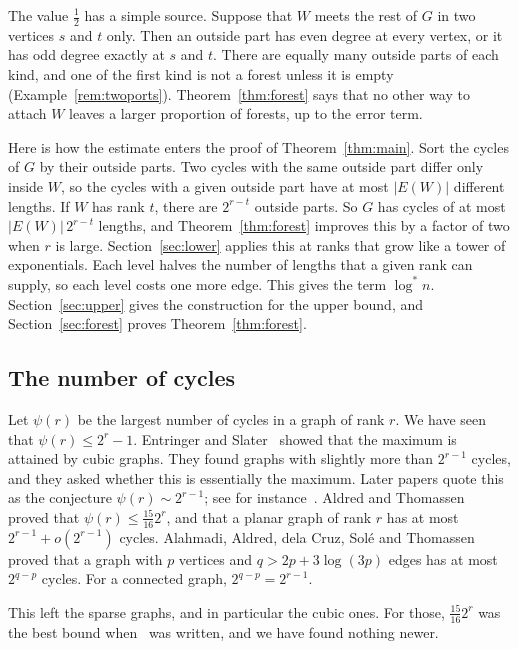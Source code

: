 \documentclass[11pt]{article}
\theoremstyle{definition}
\theoremstyle{remark}
\newcommand{\lgs}{\log^{*}}
\newcommand{\half}{\tfrac12}
\begin{document}
The value $\half$ has a simple source. Suppose that $W$ meets the rest of $G$ in two vertices $s$
and $t$ only. Then an outside part has even degree at every vertex, or it has odd degree exactly at
$s$ and $t$. There are equally many outside parts of each kind, and one of the first kind is not a
forest unless it is empty (Example~\ref{rem:twoports}). Theorem~\ref{thm:forest} says that no other
way to attach $W$ leaves a larger proportion of forests, up to the error term.

Here is how the estimate enters the proof of Theorem~\ref{thm:main}. Sort the cycles of $G$ by their
outside parts. Two cycles with the same outside part differ only inside $W$, so the cycles with a
given outside part have at most $|E(W)|$ different lengths. If $W$ has rank $t$, there are $2^{r-t}$
outside parts. So $G$ has cycles of at most $|E(W)|\,2^{r-t}$ lengths, and
Theorem~\ref{thm:forest} improves this by a factor of two when $r$ is large. Section~\ref{sec:lower}
applies this at ranks that grow like a tower of exponentials. Each level halves the number of
lengths that a given rank can supply, so each level costs one more edge. This gives the term
$\lgs n$. Section~\ref{sec:upper} gives the construction for the upper bound, and
Section~\ref{sec:forest} proves Theorem~\ref{thm:forest}.

\subsection{The number of cycles}

Let $\psi(r)$ be the largest number of cycles in a graph of rank $r$. We have seen that
$\psi(r)\le2^{r}-1$. Entringer and Slater~\cite{ES} showed that the maximum is attained by cubic
graphs. They found graphs with slightly more than $2^{r-1}$ cycles, and they asked whether this is
essentially the maximum. Later papers quote this as the conjecture $\psi(r)\sim2^{r-1}$; see for
instance~\cite{HK}. Aldred and Thomassen~\cite{AT} proved that $\psi(r)\le\frac{15}{16}2^{r}$, and
that a planar graph of rank $r$ has at most $2^{r-1}+o(2^{r-1})$ cycles. Alahmadi, Aldred, dela
Cruz, Sol\'e and Thomassen~\cite{AACST} proved that a graph with $p$ vertices and
$q>2p+3\log(3p)$ edges has at most $2^{q-p}$ cycles. For a connected graph, $2^{q-p}=2^{r-1}$.

This left the sparse graphs, and in particular the cubic ones. For those, $\frac{15}{16}2^{r}$ was
the best bound when~\cite{HK} was written, and we have found nothing newer.
\end{document}
